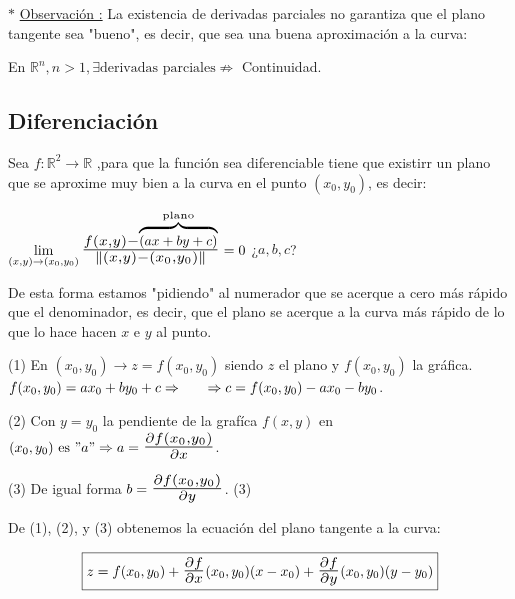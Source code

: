 \documentclass[10pt, titlepage]{article}
\newcommand{\R}{\mathbb{R}}
\newcommand{\bfrac}[2]{\scalebox{1.4}{$\frac{#1}{#2}$}}
\newcommand{\observacion}[1][\!\!]{\noindent$\ast$ \underline{Observación #1:} }
\begin{document}
\observacion La existencia de derivadas parciales no garantiza que el plano tangente sea "bueno", es decir, 
que sea una buena aproximación a la curva:
\vspace{5mm}

En $\R^n, n >1, \exists \text{derivadas parciales} \not\Rightarrow$ Continuidad.
\vspace{7mm}


\subsection{Diferenciación}
\vspace{7mm}

Sea $f : \R^2 \to \R$ ,para que la función sea diferenciable tiene que existirr un plano que se aproxime muy 
bien a la curva en el punto $(x_0, y_0)$, es decir:
\vspace{3mm}

$\displaystyle \lim_{(x, y) \to (x_0, y_0)} \bfrac{f (x, y) - \overbrace{\scalebox{0.7}{$(ax +by + c)$}}
^{\text{plano}}}{\| (x, y) - (x_0, y_0)\|} = 0$ ¿$a, b, c$?
\vspace{5mm}

De esta forma estamos "pidiendo" al numerador que se acerque a cero más rápido que el denominador, 
\indent es decir, que el plano se acerque a la curva más rápido de lo que lo hace hacen $x$ e $y$ al punto.
\vspace{5mm}

(1) En $(x_0, y_0) \rightarrow  z = f (x_0, y_0)$ siendo $z$ el plano y $f (x_0, y_0)$ la gráfica. $f (x_0, y_0) 
= a x_0 + b y_0 + c \Rightarrow \\ \indent \Rightarrow c = f (x_0, y_0) - a x_0 - b y_0$.
\vspace{3mm}

(2) Con $y = y_0$ la pendiente de la grafíca $f (x, y)$ en $(x_0, y_0) \text{ es } "a" \Rightarrow a =
\bfrac{\partial f (x_0, y_0)}{\partial x}$.
\vspace{5mm}

(3) De igual forma $b = \bfrac{\partial f (x_0, y_0)}{\partial y}$. (3)
\vspace{3mm}

De (1), (2), y (3) obtenemos la ecuación del plano tangente a la curva:
\vspace{3mm}

\[
\boxed{
z = f (x_0, y_0) + \bfrac{\partial f}{\partial x} (x_0, y_0) (x - x_0) + \bfrac{\partial f}{\partial y} (x_0, y_0) 
(y - y_0)
}
\]
\vspace{7mm}
\end{document}
